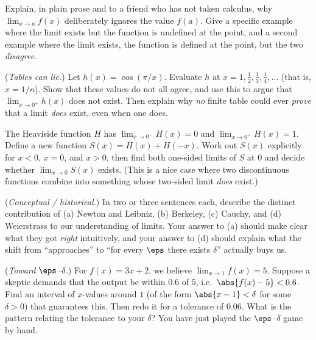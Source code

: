 \begin{exercise}
Explain, in plain prose and to a friend who has not taken calculus, why
$\displaystyle\lim_{x\to a} f(x)$ deliberately ignores the value $f(a)$. Give a specific example
where the limit exists but the function is undefined at the point, and a second example where the
limit exists, the function is defined at the point, but the two \emph{disagree}.
\end{exercise}

\begin{exercise}
(\emph{Tables can lie.}) Let $h(x) = \cos(\pi/x)$. Evaluate $h$ at $x = 1, \tfrac{1}{2},
\tfrac{1}{3}, \tfrac{1}{4}, \dots$ (that is, $x = 1/n$). Show that these values do not all agree,
and use this to argue that $\lim_{x\to 0^+} h(x)$ does not exist. Then explain why \emph{no}
finite table could ever \emph{prove} that a limit \emph{does} exist, even when one does.
\end{exercise}

\begin{exercise}
The Heaviside function $H$ has $\lim_{x\to 0^-}H(x)=0$ and $\lim_{x\to 0^+}H(x)=1$. Define a new
function $S(x) = H(x) + H(-x)$. Work out $S(x)$ explicitly for $x<0$, $x=0$, and $x>0$, then find
both one-sided limits of $S$ at $0$ and decide whether $\lim_{x\to 0}S(x)$ exists. (This is a nice
case where two discontinuous functions combine into something whose two-sided limit \emph{does}
exist.)
\end{exercise}

\begin{exercise}
(\emph{Conceptual / historical.}) In two or three sentences each, describe the distinct
contribution of (a) Newton and Leibniz, (b) Berkeley, (c) Cauchy, and (d) Weierstrass to our
understanding of limits. Your answer to (a) should make clear what they got \emph{right}
intuitively, and your answer to (d) should explain what the shift from ``approaches'' to ``for
every $\eps$ there exists $\delta$'' actually buys us.
\end{exercise}

\begin{exercise}
(\emph{Toward $\eps$--$\delta$.}) For $f(x) = 3x + 2$, we believe $\lim_{x\to 1} f(x) = 5$.
Suppose a skeptic demands that the output be within $0.6$ of $5$, i.e.\ $\abs{f(x) - 5} < 0.6$.
Find an interval of $x$-values around $1$ (of the form $\abs{x - 1} < \delta$ for some $\delta>0$)
that guarantees this. Then redo it for a tolerance of $0.06$. What is the pattern relating the
tolerance to your $\delta$? You have just played the $\eps$--$\delta$ game by hand.
\end{exercise}
